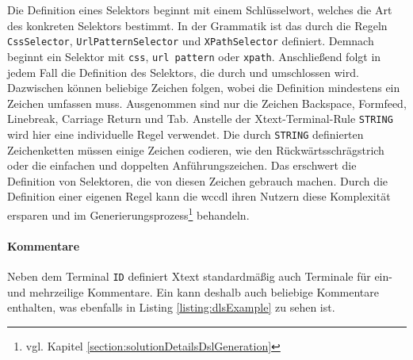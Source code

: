     Die Definition eines Selektors beginnt mit einem Schlüsselwort,
    welches die Art des konkreten Selektors bestimmt.
    In der Grammatik ist das durch die Regeln
    \texttt{CssSelector}, \texttt{UrlPatternSelector} und \texttt{XPathSelector} definiert.
    Demnach beginnt ein Selektor mit \texttt{css}, \texttt{url pattern} oder \texttt{xpath}.
    Anschließend folgt in jedem Fall die Definition des Selektors,
    die durch {\flqq } und {\frqq } umschlossen wird.
    Dazwischen können beliebige Zeichen folgen, wobei die Definition mindestens ein Zeichen umfassen muss.
    Ausgenommen sind nur die Zeichen Backspace, Formfeed, Linebreak, Carriage Return und Tab.
    Anstelle der Xtext-Terminal-Rule \texttt{STRING} wird hier eine individuelle Regel verwendet.
    Die durch \texttt{STRING} definierten Zeichenketten müssen einige Zeichen codieren,
    wie den Rückwärtsschrägstrich oder die einfachen und doppelten Anführungszeichen.
    Das erschwert die Definition von Selektoren, die von diesen Zeichen gebrauch machen.
    Durch die Definition einer eigenen Regel kann die \gls{wccdl} ihren Nutzern diese Komplexität
    ersparen und im Generierungsprozess\footnote{vgl. Kapitel \ref{section:solutionDetailsDslGeneration}} behandeln.

    \paragraph{Kommentare}
    Neben dem Terminal \texttt{ID} definiert Xtext standardmäßig auch Terminale für ein- und mehrzeilige Kommentare.
    Ein {\classificationModel} kann deshalb auch beliebige Kommentare enthalten,
    was ebenfalls in Listing \ref{listing:dlsExample} zu sehen ist.
